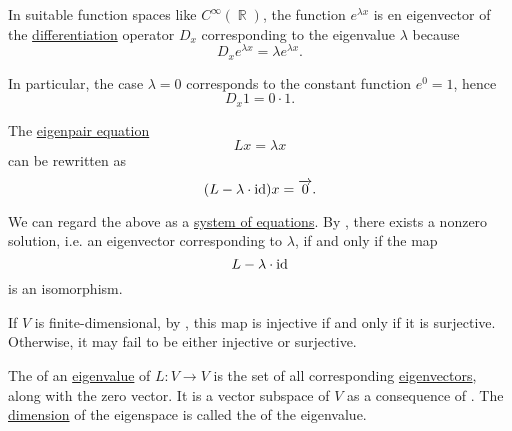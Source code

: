 \begin{example}
\begin{thmenum}
     In suitable function spaces like \( C^\infty(\BbbR) \), the function \( e^{\lambda x} \) is en eigenvector of the \hyperref[def:differentiability]{differentiation} operator \( D_x \) corresponding to the eigenvalue \( \lambda \) because
    \begin{equation*}
      D_x e^{\lambda x} = \lambda e^{\lambda x}.
    \end{equation*}

    In particular, the case \( \lambda = 0 \) corresponds to the constant function \( e^0 = 1 \), hence
    \begin{equation*}
      D_x 1 = 0 \cdot 1.
    \end{equation*}
  \end{thmenum}
\end{example}

\begin{remark}\label{rem:eigenpairs_via_invertibility}
  The \hyperref[def:eigenpair]{eigenpair equation}
  \begin{equation*}
    Lx = \lambda x
  \end{equation*}
  can be rewritten as
  \begin{equation*}
    (L - \lambda \cdot \operatorname{id}) x = \overrightarrow{0}.
  \end{equation*}

  We can regard the above as a \hyperref[rem:system_of_equations]{system of equations}. By , there exists a nonzero solution, i.e. an eigenvector corresponding to \( \lambda \), if and only if the map
  \begin{equation*}
    L - \lambda \cdot \operatorname{id}
  \end{equation*}
  is an isomorphism.

  If \( V \) is finite-dimensional, by , this map is injective if and only if it is surjective. Otherwise, it may fail to be either injective or surjective.
\end{remark}

\begin{definition}\label{def:eigenspace}
  The  of an \hyperref[def:eigenpair]{eigenvalue} of \( L: V \to V \) is the set of all corresponding \hyperref[def:eigenpair]{eigenvectors}, along with the zero vector. It is a vector subspace of \( V \) as a consequence of . The \hyperref[thm:vector_space_dimension]{dimension} of the eigenspace is called the  of the eigenvalue.
\end{definition}

